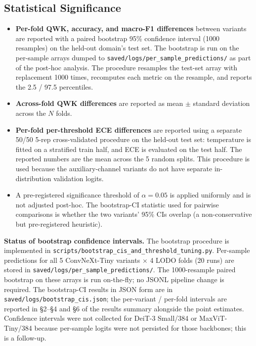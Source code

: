 \documentclass[11pt]{article}
\begin{document}
\subsection{Statistical Significance}
\label{sec:statistical-significance}
\begin{itemize}[leftmargin=*, topsep=0pt]
  \item \textbf{Per-fold QWK, accuracy, and macro-F1 differences} between variants are reported with a paired bootstrap 95\% confidence interval (1000 resamples) on the held-out domain's test set. The bootstrap is run on the per-sample arrays dumped to \texttt{saved/logs/per\_sample\_predictions/} as part of the post-hoc analysis. The procedure resamples the test-set array with replacement 1000 times, recomputes each metric on the resample, and reports the 2.5 / 97.5 percentiles.
  \item \textbf{Across-fold QWK differences} are reported as mean $\pm$ standard deviation across the $N$ folds.
  \item \textbf{Per-fold per-threshold ECE differences} are reported using a separate 50/50 5-rep cross-validated procedure on the held-out test set: temperature is fitted on a stratified train half, and ECE is evaluated on the test half. The reported numbers are the mean across the 5 random splits. This procedure is used because the auxiliary-channel variants do not have separate in-distribution validation logits.
  \item A pre-registered significance threshold of $\alpha = 0.05$ is applied uniformly and is not adjusted post-hoc. The bootstrap-CI statistic used for pairwise comparisons is whether the two variants' 95\% CIs overlap (a non-conservative but pre-registered heuristic).
\end{itemize}

\textbf{Status of bootstrap confidence intervals.} The bootstrap procedure is implemented in \texttt{scripts/bootstrap\_cis\_and\_threshold\_tuning.py}. Per-sample predictions for all 5 ConvNeXt-Tiny variants $\times$ 4 LODO folds (20 runs) are stored in \texttt{saved/logs/per\_sample\_predictions/}. The 1000-resample paired bootstrap on these arrays is run on-the-fly; no JSONL pipeline change is required. The bootstrap-CI results in JSON form are in \texttt{saved/logs/bootstrap\_cis.json}; the per-variant / per-fold intervals are reported in §2--§4 and §6 of the results summary alongside the point estimates. Confidence intervals were not collected for DeiT-3 Small/384 or MaxViT-Tiny/384 because per-sample logits were not persisted for those backbones; this is a follow-up.
\end{document}
